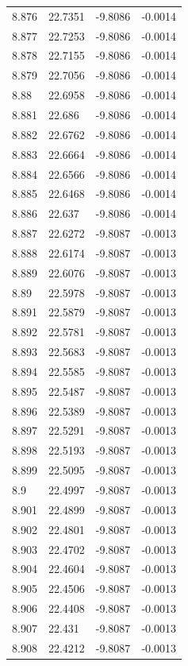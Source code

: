 \begin{tabular}{llll}
8.876 & 22.7351 & -9.8086 & -0.0014 \\
8.877 & 22.7253 & -9.8086 & -0.0014 \\
8.878 & 22.7155 & -9.8086 & -0.0014 \\
8.879 & 22.7056 & -9.8086 & -0.0014 \\
8.88 & 22.6958 & -9.8086 & -0.0014 \\
8.881 & 22.686 & -9.8086 & -0.0014 \\
8.882 & 22.6762 & -9.8086 & -0.0014 \\
8.883 & 22.6664 & -9.8086 & -0.0014 \\
8.884 & 22.6566 & -9.8086 & -0.0014 \\
8.885 & 22.6468 & -9.8086 & -0.0014 \\
8.886 & 22.637 & -9.8086 & -0.0014 \\
8.887 & 22.6272 & -9.8087 & -0.0013 \\
8.888 & 22.6174 & -9.8087 & -0.0013 \\
8.889 & 22.6076 & -9.8087 & -0.0013 \\
8.89 & 22.5978 & -9.8087 & -0.0013 \\
8.891 & 22.5879 & -9.8087 & -0.0013 \\
8.892 & 22.5781 & -9.8087 & -0.0013 \\
8.893 & 22.5683 & -9.8087 & -0.0013 \\
8.894 & 22.5585 & -9.8087 & -0.0013 \\
8.895 & 22.5487 & -9.8087 & -0.0013 \\
8.896 & 22.5389 & -9.8087 & -0.0013 \\
8.897 & 22.5291 & -9.8087 & -0.0013 \\
8.898 & 22.5193 & -9.8087 & -0.0013 \\
8.899 & 22.5095 & -9.8087 & -0.0013 \\
8.9 & 22.4997 & -9.8087 & -0.0013 \\
8.901 & 22.4899 & -9.8087 & -0.0013 \\
8.902 & 22.4801 & -9.8087 & -0.0013 \\
8.903 & 22.4702 & -9.8087 & -0.0013 \\
8.904 & 22.4604 & -9.8087 & -0.0013 \\
8.905 & 22.4506 & -9.8087 & -0.0013 \\
8.906 & 22.4408 & -9.8087 & -0.0013 \\
8.907 & 22.431 & -9.8087 & -0.0013 \\
8.908 & 22.4212 & -9.8087 & -0.0013 \\

\end{tabular}
